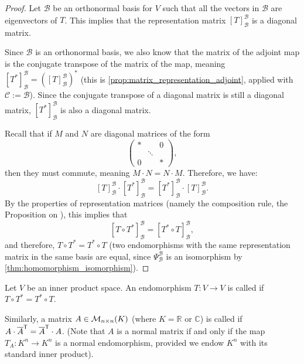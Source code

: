 \begin{proof}
Let $\mathcal{B}$ be an orthonormal basis for $V$ such that all the vectors in $\mathcal{B}$ are eigenvectors of $T$. This implies that the representation matrix $[T]_{\mathcal{B}}^{\mathcal{B}}$ is a diagonal matrix. 

Since $\mathcal{B}$ is an orthonormal basis, we also know that the matrix of the adjoint map is the conjugate transpose of the matrix of the map, meaning $[T^*]_{\mathcal{B}}^{\mathcal{B}} = \left([T]_{\mathcal{B}}^{\mathcal{B}}\right)^*$ (this is \cref{prop:matrix_representation_adjoint}, applied with $\mathcal{C} := \mathcal{B}$). Since the conjugate transpose of a diagonal matrix is still a diagonal matrix, $[T^*]_{\mathcal{B}}^{\mathcal{B}}$ is also a diagonal matrix. 

Recall that if $M$ and $N$ are diagonal matrices of the form
\[
    \begin{pmatrix}
        * & & 0 \\
        & \ddots & \\
        0 & & *
    \end{pmatrix},
\]
then they must commute, meaning $M \cdot N = N \cdot M$. Therefore, we have:
\[
    [T]_{\mathcal{B}}^{\mathcal{B}} \cdot [T^*]_{\mathcal{B}}^{\mathcal{B}} = [T^*]_{\mathcal{B}}^{\mathcal{B}} \cdot [T]_{\mathcal{B}}^{\mathcal{B}}.
\]
By the properties of representation matrices (namely the composition rule, the Proposition on ), this implies that
\[
    [T \circ T^*]_{\mathcal{B}}^{\mathcal{B}} = [T^* \circ T]_{\mathcal{B}}^{\mathcal{B}},
\]
and therefore, $T \circ T^* = T^* \circ T$ (two endomorphisms with the same representation matrix in the same basis are equal, since $\Psi_{\mathcal{B}}^{\mathcal{B}}$ is an isomorphism by \cref{thm:homomorphism_isomorphism}).
\end{proof}

\begin{definition}
\label{def:normal_endomorphism}
Let $V$ be an inner product space. An endomorphism $T \colon V \to V$ is called  if $T \circ T^* = T^* \circ T$. 

Similarly, a matrix $A \in \mathcal{M}_{n \times n}(K)$ (where $K = \mathbb{R}$ or $\mathbb{C}$) is called  if $A \cdot \overline{A}^{\mathsf{T}} = \overline{A}^{\mathsf{T}} \cdot A$. (Note that $A$ is a normal matrix if and only if the map $T_A \colon K^n \to K^n$ is a normal endomorphism, provided we endow $K^n$ with its standard inner product).
\end{definition}

